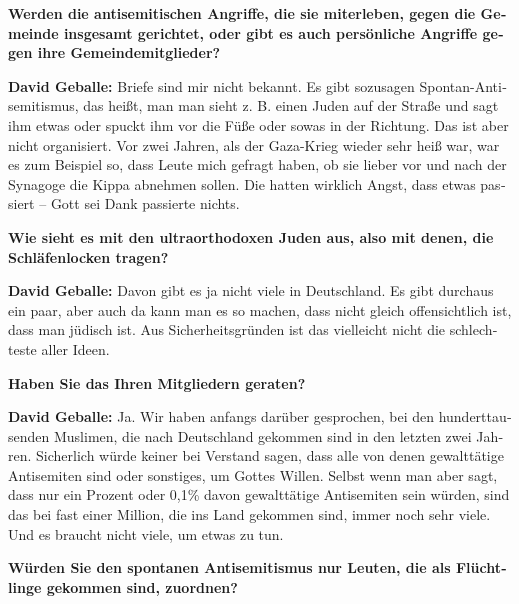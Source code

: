 \begin{otherlanguage}{ngerman}


\textbf{Werden die antisemitischen Angriffe, die sie miterleben, gegen die Gemeinde insgesamt gerichtet, oder gibt es auch persönliche Angriffe gegen ihre Gemeindemitglieder?} 

\textbf{David Geballe:} Briefe sind mir nicht bekannt. Es gibt sozusagen Spontan-Antisemitismus, das heißt, man man sieht z. B. einen Juden auf der Straße und sagt ihm etwas oder spuckt ihm vor die Füße oder sowas in der Richtung. Das ist aber nicht organisiert. Vor zwei Jahren, als der Gaza-Krieg wieder sehr heiß war, war es zum Beispiel so, dass Leute mich gefragt haben, ob sie lieber vor und nach der Synagoge die Kippa abnehmen sollen. Die hatten wirklich Angst, dass etwas passiert – Gott sei Dank passierte nichts. 

\textbf{Wie sieht es mit den ultraorthodoxen Juden aus, also mit denen, die Schläfenlocken tragen?} 

\textbf{David Geballe:} Davon gibt es ja nicht viele in Deutschland. Es gibt durchaus ein paar, aber auch da kann man es so machen, dass nicht gleich offensichtlich ist, dass man jüdisch ist. Aus Sicherheitsgründen ist das vielleicht nicht die schlechteste aller Ideen. 

\textbf{Haben Sie das Ihren Mitgliedern geraten?} 

\textbf{David Geballe:} Ja. Wir haben anfangs darüber gesprochen, bei den hunderttausenden Muslimen, die nach Deutschland gekommen sind in den letzten zwei Jahren. Sicherlich würde keiner bei Verstand sagen, dass alle von denen gewalttätige Antisemiten sind oder sonstiges, um Gottes Willen. Selbst wenn man aber sagt, dass nur ein Prozent oder 0,1\% davon gewalttätige Antisemiten sein würden, sind das bei fast einer Million, die ins Land gekommen sind, immer noch sehr viele. Und es braucht nicht viele, um etwas zu tun. 

\textbf{Würden Sie den spontanen Antisemitismus nur Leuten, die als Flüchtlinge gekommen sind, zuordnen?} 


\end{otherlanguage}
